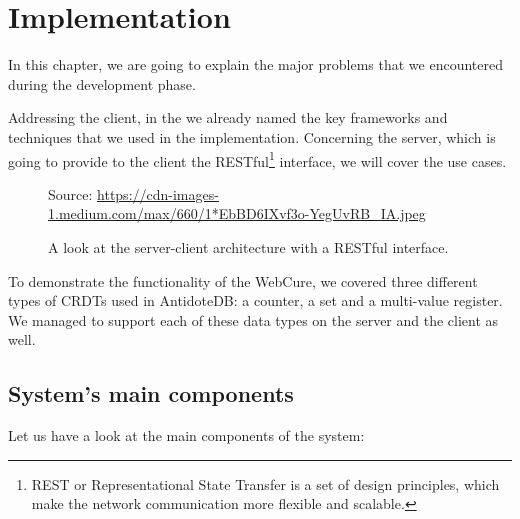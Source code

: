 \chapter{Implementation}
\label{Implementation}

In this chapter, we are going to explain the major problems that we encountered during the development phase.

Addressing the client, in the  we already named the key frameworks and techniques that we used in the implementation. Concerning the server, which is going to provide to the client the RESTful\footnote{REST or Representational State Transfer is a set of design principles, which make the network communication more flexible and scalable\cite{40}.} interface, we will cover the use cases.

\begin{figure}[!htb]
    \begin{center}
    \setlength{\fboxsep}{4pt}%
    \setlength{\fboxrule}{1pt}%
    {\scriptsize%
     Source: \url{https://cdn-images-1.medium.com/max/660/1*EbBD6IXvf3o-YegUvRB_IA.jpeg}}
    \caption {A look at the server-client architecture with a RESTful interface.}
    \label{fig:design1}
\end{center}
\end{figure}

To demonstrate the functionality of the WebCure, we covered three different types of CRDTs used in AntidoteDB: a counter, a set and a multi-value register. We managed to support each of these data types on the server and the client as well.

\section{System's main components}

Let us have a look at the main components of the system:

